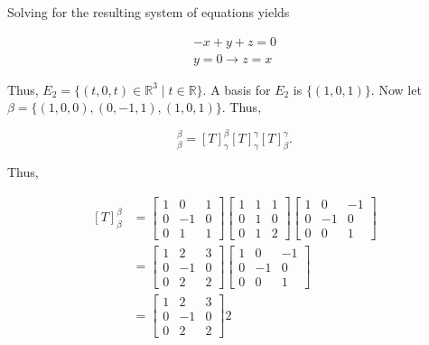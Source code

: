 \documentclass[12pt, a4paper]{article}
\begin{document}
\vspace{2mm}

\noindent Solving for the resulting system of equations yields

\begin{equation*}
    \begin{split}
        -x+y+z=0 \\
        y=0 \rightarrow z=x
    \end{split}
\end{equation*}

\vspace{2mm}

\noindent Thus, $E_2=\{(t,0,t)\in\mathbb{R}^3\mid t\in\mathbb{R}\}$. A basis for $E_2$ is $\{(1,0,1)\}$. Now let $\beta=\{(1,0,0),(0,-1,1),(1,0,1)\}$. Thus, 

\begin{equation*}
    [T]_{\beta}^{\beta} = [T]_{\gamma}^{\beta}[T]_{\gamma}^{\gamma}[T]_{\beta}^{\gamma}.
\end{equation*}

\vspace{2mm}

\noindent Thus,

\begin{equation*}
    \begin{split}
        [T]_{\beta}^{\beta} &=
        \begin{bmatrix}
            1 & 0 & 1 \\
            0 & -1 & 0 \\
            0 & 1 & 1
        \end{bmatrix}
        \begin{bmatrix}
            1 & 1 & 1 \\
            0 & 1 & 0 \\
            0 & 1 & 2
        \end{bmatrix}
        \begin{bmatrix}
            1 & 0 & -1 \\
            0 & -1 & 0 \\
            0 & 0 & 1
        \end{bmatrix} \\
        &=
        \begin{bmatrix}
            1 & 2 & 3 \\
            0 & -1 & 0 \\
            0 & 2 & 2
        \end{bmatrix}
        \begin{bmatrix}
            1 & 0 & -1 \\
            0 & -1 & 0 \\
            0 & 0 & 1
        \end{bmatrix} \\
        &=
        \begin{bmatrix}
            1 & 2 & 3 \\
            0 & -1 & 0 \\
            0 & 2 & 2
        \end{bmatrix}2
    \end{split}    
\end{equation*}
\end{document}
